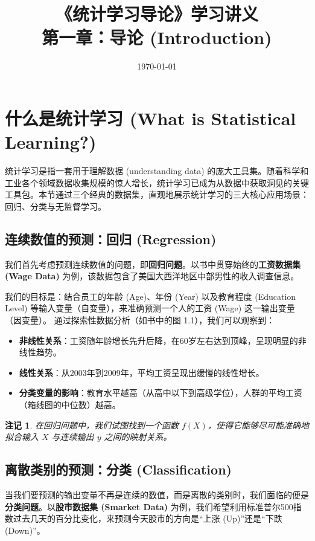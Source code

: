 \documentclass[UTF8]{ctexart}
\title{《统计学习导论》学习讲义 \\ \Large 第一章：导论 (Introduction)}
\author{}
\date{\today}
\newtheorem{remark}{注记}[section]
\numberwithin{equation}{section}
\begin{document}
\maketitle

\section{什么是统计学习 (What is Statistical Learning?)}

统计学习是指一套用于理解数据 (understanding data) 的庞大工具集。随着科学和工业各个领域数据收集规模的惊人增长，统计学习已成为从数据中获取洞见的关键工具包。本节通过三个经典的数据集，直观地展示统计学习的三大核心应用场景：回归、分类与无监督学习。

\subsection{连续数值的预测：回归 (Regression)}

我们首先考虑预测连续数值的问题，即\textbf{回归问题}。以书中贯穿始终的\textbf{工资数据集 (Wage Data)} 为例，该数据包含了美国大西洋地区中部男性的收入调查信息。

我们的目标是：结合员工的年龄 (Age)、年份 (Year) 以及教育程度 (Education Level) 等输入变量（自变量），来准确预测一个人的工资 (Wage) 这一输出变量（因变量）。
通过探索性数据分析（如书中的图 1.1），我们可以观察到：
\begin{itemize}
    \item \textbf{非线性关系}：工资随年龄增长先升后降，在60岁左右达到顶峰，呈现明显的非线性趋势。
    \item \textbf{线性关系}：从2003年到2009年，平均工资呈现出缓慢的线性增长。
    \item \textbf{分类变量的影响}：教育水平越高（从高中以下到高级学位），人群的平均工资（箱线图的中位数）越高。
\end{itemize}

\begin{remark}
在回归问题中，我们试图找到一个函数 $f(X)$，使得它能够尽可能准确地拟合输入 $X$ 与连续输出 $y$ 之间的映射关系。
\end{remark}

\subsection{离散类别的预测：分类 (Classification)}

当我们要预测的输出变量不再是连续的数值，而是离散的类别时，我们面临的便是\textbf{分类问题}。以\textbf{股市数据集 (Smarket Data)} 为例，我们希望利用标准普尔500指数过去几天的百分比变化，来预测今天股市的方向是“上涨 (Up)”还是“下跌 (Down)”。
\end{document}
